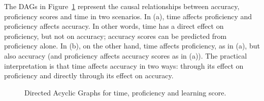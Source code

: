 \documentclass[
  letterpaper,
  DIV=11,
  numbers=noendperiod]{scrartcl}
\begin{document}
The DAGs in Figure~\ref{fig-d1-dag} represent the causal relationships
between accuracy, proficiency scores and time in two scenarios. In (a),
time affects proficiency and proficiency affects accuracy. In other
words, time has a direct effect on proficiency, but not on accuracy;
accuracy scores can be predicted from proficiency alone. In (b), on the
other hand, time affects proficiency, as in (a), but also accuracy (and
proficiency affects accuracy scores as in (a)). The practical
interpretation is that time affects accuracy in two ways: through its
effect on proficiency and directly through its effect on accuracy.

\begin{figure}

\begin{minipage}{0.50\linewidth}



\end{minipage}%
%
\begin{minipage}{0.50\linewidth}



\end{minipage}%

\caption{\label{fig-d1-dag}Directed Acyclic Graphs for time, proficiency
and learning score.}

\end{figure}%
\end{document}
